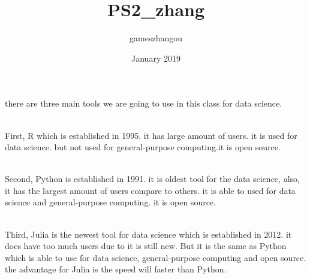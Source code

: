 \documentclass{article}
\title{PS2_zhang}
\author{gameszhangou }
\date{January 2019}
\begin{document}
there are three main tools we are going to use in this class for data science.

\
\\
First, R which is established in 1995. it has large amount of users. it is used for data science. but not used for general-purpose computing.it is open source.

\
\\
Second, Python is established in 1991. it is oldest tool for the data science, also, it has the largest amount of users compare to others. it is able to used for data science and general-purpose computing. it is open source.

\
\\
Third, Julia is the newest tool for data science which is established in 2012. it does have too much users due to it is still new. But it is the same as Python which is able to use for data science, general-purpose computing and open source. the advantage for Julia is the speed will faster than Python.
\end{document}
